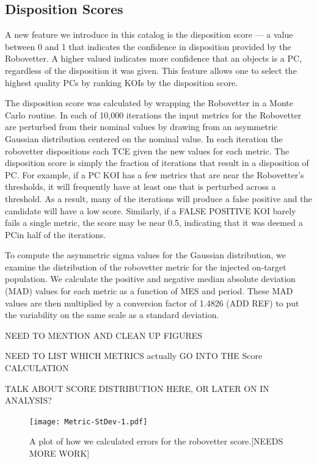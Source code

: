 

\subsection{Disposition Scores}
\label{s:scores}
A new feature we introduce in this catalog is the disposition score --- a value between 0 and 1 that indicates the confidence in disposition provided by the Robovetter. A higher valued indicates more confidence that an objects is a PC, regardless of the disposition it was given.  This feature allows one to select the highest quality PCs by ranking KOIs by the disposition score. 

The disposition score was calculated by wrapping the Robovetter in a Monte Carlo routine. In each of 10,000 iterations the input metrics for the Robovetter are perturbed from their nominal values by drawing from an asymmetric Gaussian distribution centered on the nominal value. In each iteration the robovetter dispositions each TCE given the new values for each metric. The disposition score is simply the fraction of iterations that result in a disposition of PC. For example, if a PC KOI has a few metrics that are near the Robovetter's thresholds, it will frequently have at least one that is perturbed across a threshold. As a result, many of the iterations will produce a false positive and the candidate will have a low score.  Similarly, if a FALSE POSITIVE KOI barely fails a single metric, the score may be near 0.5, indicating that it was deemed a PCin half of the iterations.

To compute the asymmetric sigma values for the Gaussian distribution, we examine the distribution of the robovetter metric for the injected on-target population. We calculate the positive and negative median absolute deviation (MAD) values for each metric as a function of MES and period. These MAD values are then multiplied by a conversion factor of 1.4826 (ADD REF) to put the variability on the same scale as a standard deviation.

NEED TO MENTION AND CLEAN UP FIGURES

NEED TO LIST WHICH METRICS actually GO INTO THE Score CALCULATION

TALK ABOUT SCORE DISTRIBUTION HERE, OR LATER ON IN ANALYSIS?

\begin{figure}
\centering
\texttt{[image: Metric-StDev-1.pdf]}
\caption{A plot of how we calculated errors for the robovetter score.[NEEDS MORE WORK]}
\label{score-fig-1}
\end{figure}

